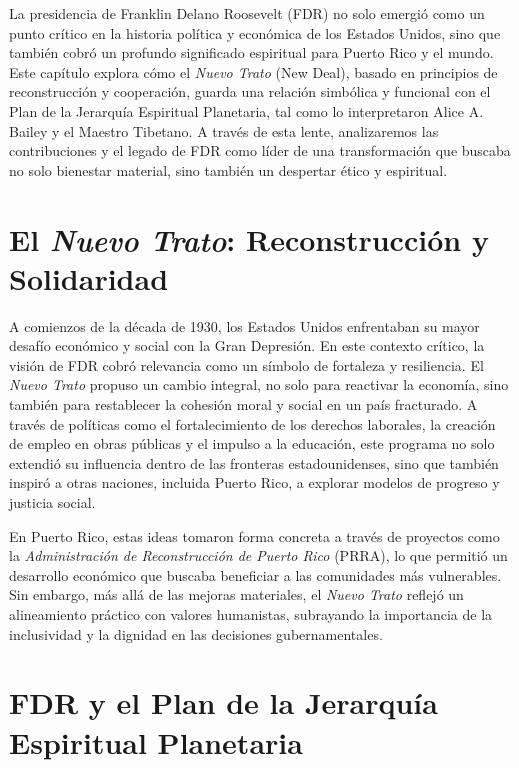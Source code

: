 \documentclass[
]{book}
\begin{document}
La presidencia de Franklin Delano Roosevelt (FDR) no solo emergió como un punto crítico en la historia política y económica de los Estados Unidos, sino que también cobró un profundo significado espiritual para Puerto Rico y el mundo. Este capítulo explora cómo el \emph{Nuevo Trato} (New Deal), basado en principios de reconstrucción y cooperación, guarda una relación simbólica y funcional con el Plan de la Jerarquía Espiritual Planetaria, tal como lo interpretaron Alice A. Bailey y el Maestro Tibetano. A través de esta lente, analizaremos las contribuciones y el legado de FDR como líder de una transformación que buscaba no solo bienestar material, sino también un despertar ético y espiritual.

\section{\texorpdfstring{El \emph{Nuevo Trato}: Reconstrucción y Solidaridad}{El Nuevo Trato: Reconstrucción y Solidaridad}}\label{el-nuevo-trato-reconstrucciuxf3n-y-solidaridad}

A comienzos de la década de 1930, los Estados Unidos enfrentaban su mayor desafío económico y social con la Gran Depresión. En este contexto crítico, la visión de FDR cobró relevancia como un símbolo de fortaleza y resiliencia. El \emph{Nuevo Trato} propuso un cambio integral, no solo para reactivar la economía, sino también para restablecer la cohesión moral y social en un país fracturado. A través de políticas como el fortalecimiento de los derechos laborales, la creación de empleo en obras públicas y el impulso a la educación, este programa no solo extendió su influencia dentro de las fronteras estadounidenses, sino que también inspiró a otras naciones, incluida Puerto Rico, a explorar modelos de progreso y justicia social.

En Puerto Rico, estas ideas tomaron forma concreta a través de proyectos como la \emph{Administración de Reconstrucción de Puerto Rico} (PRRA), lo que permitió un desarrollo económico que buscaba beneficiar a las comunidades más vulnerables. Sin embargo, más allá de las mejoras materiales, el \emph{Nuevo Trato} reflejó un alineamiento práctico con valores humanistas, subrayando la importancia de la inclusividad y la dignidad en las decisiones gubernamentales.

\section{FDR y el Plan de la Jerarquía Espiritual Planetaria}\label{fdr-y-el-plan-de-la-jerarquuxeda-espiritual-planetaria}
\end{document}
